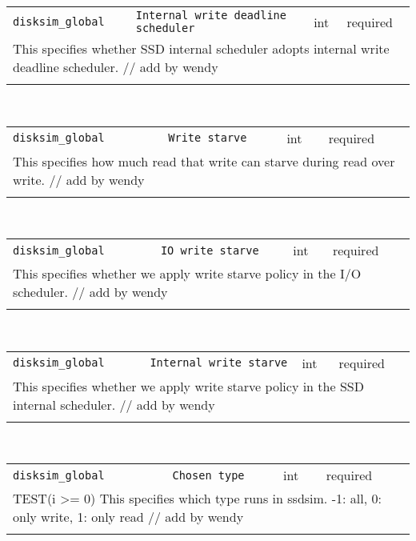 \noindent 
\begin{tabular}{|p{\lpmodwidth}|p{\lpnamewidth}|p{0.5in}|p{0.5in}|}
\cline{1-4}
\texttt{disksim\_global} & \texttt{Internal write deadline scheduler} & int & required \\ 
\cline{1-4}
\multicolumn{4}{|p{6in}|}{
This specifies whether SSD internal scheduler adopts internal write deadline scheduler. // add by wendy
}\\ 
\cline{1-4}
\multicolumn{4}{p{5in}}{}\\
\end{tabular}\\ 
\noindent 
\begin{tabular}{|p{\lpmodwidth}|p{\lpnamewidth}|p{0.5in}|p{0.5in}|}
\cline{1-4}
\texttt{disksim\_global} & \texttt{Write starve} & int & required \\ 
\cline{1-4}
\multicolumn{4}{|p{6in}|}{
This specifies how much read that write can starve during read over write. // add by wendy
}\\ 
\cline{1-4}
\multicolumn{4}{p{5in}}{}\\
\end{tabular}\\ 
\noindent 
\begin{tabular}{|p{\lpmodwidth}|p{\lpnamewidth}|p{0.5in}|p{0.5in}|}
\cline{1-4}
\texttt{disksim\_global} & \texttt{IO write starve} & int & required \\ 
\cline{1-4}
\multicolumn{4}{|p{6in}|}{
This specifies whether we apply write starve policy in the I/O scheduler. // add by wendy
}\\ 
\cline{1-4}
\multicolumn{4}{p{5in}}{}\\
\end{tabular}\\ 
\noindent 
\begin{tabular}{|p{\lpmodwidth}|p{\lpnamewidth}|p{0.5in}|p{0.5in}|}
\cline{1-4}
\texttt{disksim\_global} & \texttt{Internal write starve} & int & required \\ 
\cline{1-4}
\multicolumn{4}{|p{6in}|}{
This specifies whether we apply write starve policy in the SSD internal scheduler. // add by wendy
}\\ 
\cline{1-4}
\multicolumn{4}{p{5in}}{}\\
\end{tabular}\\ 
\noindent 
\begin{tabular}{|p{\lpmodwidth}|p{\lpnamewidth}|p{0.5in}|p{0.5in}|}
\cline{1-4}
\texttt{disksim\_global} & \texttt{Chosen type} & int & required \\ 
\cline{1-4}
\multicolumn{4}{|p{6in}|}{
TEST(i >= 0)
This specifies which type runs in ssdsim. -1: all, 0: only write, 1: only read // add by wendy
}\\ 
\cline{1-4}
\multicolumn{4}{p{5in}}{}\\
\end{tabular}\\ 
